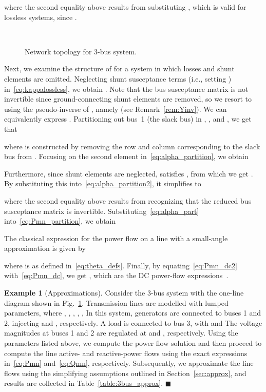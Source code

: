 \documentclass[journal]{IEEEtran}
\theoremstyle{definition}
\newtheorem{example}{Example}
\newcommand{\qedblack}{\hfill \ensuremath{\blacksquare}}
\begin{document}
where the second equality above results from substituting , which is valid for lossless systems, since . 

\begin{figure}[t!]
\centering
\mbox{
}
\caption{Network topology for 3-bus system.}
\label{fig:3bus}
\vspace{-7pt}
\end{figure}

Next, we examine the structure of  for a system in which losses and shunt elements are omitted.  Neglecting shunt susceptance terms (i.e., setting ) in~\eqref{eq:kappalossless}, we obtain .  Note that the bus susceptance matrix  is not invertible since ground-connecting shunt elements are removed, so we resort to using the pseudo-inverse of , namely  (see Remark~\ref{rem:Yinv}).  We can equivalently express .  Partitioning out bus~1 (the slack bus) in , , and , we get that

where  is constructed by removing the row and column corresponding to the slack bus from . Focusing on the second element in~\eqref{eq:alpha_partition}, we obtain

Furthermore, since shunt elements are neglected,  satisfies , from which we get .  By substituting this into~\eqref{eq:alpha_partition2}, it simplifies to

where the second equality above results from recognizing that the reduced bus susceptance matrix  is invertible.  Substituting~\eqref{eq:alpha_part} into~\eqref{eq:Pmn_partition}, we  obtain 
  
The classical expression for the power flow on a line with a small-angle approximation is given by~\cite{Glover:2012} 

where  is as defined in~\eqref{eq:theta_defs}.  Finally, by equating~\eqref{eq:Pmn_dc2} with~\eqref{eq:Pmn_dc}, we get , which are the DC power-flow expressions~\cite{Glover:2012}.

\begin{example}[Approximations]
\label{ex:3bus1}
Consider the 3-bus system with the one-line diagram shown in Fig.~\ref{fig:3bus}.  Transmission lines are modelled with lumped parameters, where , , , , ,    In this system, generators are connected to buses 1 and 2, injecting  and , respectively.  A  load is connected to bus 3, with  and   The voltage magnitudes at buses 1 and 2 are regulated at  and , respectively.  Using the parameters listed above, we compute the power flow solution and then proceed to compute the line active- and reactive-power flows using the exact expressions in~\eqref{eq:Pmn} and~\eqref{eq:Qmn}, respectively.  Subsequently, we approximate the line flows using the simplifying assumptions outlined in Section~\ref{sec:approx}, and results are collected in Table~\ref{table:3bus_approx}. \qedblack 
\end{example} 
\end{document}
